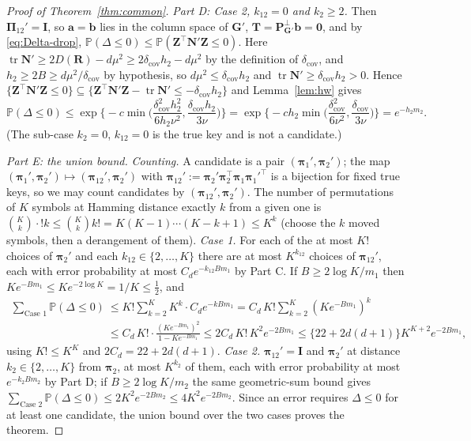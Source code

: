 \documentclass[11pt]{article}
\theoremstyle{definition}
\newcommand{\bT}{\mathbf{T}}
\newcommand{\bZ}{\mathbf{Z}}
\newcommand{\bI}{\mathbf{I}}
\newcommand{\bR}{\mathbf{R}}
\newcommand{\bN}{\mathbf{N}}
\newcommand{\bzero}{\mathbf{0}}
\newcommand{\bpi}{\boldsymbol{\pi}}
\newcommand{\bPi}{\boldsymbol{\Pi}}
\newcommand{\Prob}{\mathbb{P}}
\newcommand{\tr}{\operatorname{tr}}
\begin{document}
\begin{proof}[Proof of Theorem~\ref{thm:common}]
\emph{Part D: Case 2, $k_{12}=0$ and $k_2\ge2$.} Then $\bPi_{12}'=\bI$, so $\bm a=\bm b$ lies in the column space of $\mathbf G'$, $\bT=\mathbf P^\perp_{\mathbf G'}\bm b=\bzero$, and by \eqref{eq:Delta-drop}, $\Prob(\Delta\le0)\le\Prob(\bZ^\top\bN'\bZ\le0)$. Here $\tr\bN'\ge2D(\bR)-d\mu^2\ge2\delta_{\mathrm{cov}}h_2-d\mu^2$ by the definition of $\delta_{\mathrm{cov}}$, and $h_2\ge2B\ge d\mu^2/\delta_{\mathrm{cov}}$ by hypothesis, so $d\mu^2\le\delta_{\mathrm{cov}}h_2$ and $\tr\bN'\ge\delta_{\mathrm{cov}}h_2>0$. Hence $\{\bZ^\top\bN'\bZ\le0\}\subseteq\{\bZ^\top\bN'\bZ-\tr\bN'\le-\delta_{\mathrm{cov}}h_2\}$ and Lemma~\ref{lem:hw} gives
\[
\Prob(\Delta\le0)\le\exp\Big\{-c\min\Big(\frac{\delta_{\mathrm{cov}}^2h_2^2}{6h_2\nu^2},\frac{\delta_{\mathrm{cov}}h_2}{3\nu}\Big)\Big\}=\exp\Big\{-ch_2\min\Big(\frac{\delta_{\mathrm{cov}}^2}{6\nu^2},\frac{\delta_{\mathrm{cov}}}{3\nu}\Big)\Big\}=e^{-h_2m_2}.
\]
(The sub-case $k_2=0$, $k_{12}=0$ is the true key and is not a candidate.)

\emph{Part E: the union bound.} \emph{Counting.} A candidate is a pair $(\bpi_1',\bpi_2')$; the map $(\bpi_1',\bpi_2')\mapsto(\bpi_{12}',\bpi_2')$ with $\bpi_{12}':=\bpi_2'\bpi_2^\top\bpi_1\bpi_1'^\top$ is a bijection for fixed true keys, so we may count candidates by $(\bpi_{12}',\bpi_2')$. The number of permutations of $K$ symbols at Hamming distance exactly $k$ from a given one is $\binom Kk\cdot!k\le\binom Kkk!=K(K-1)\cdots(K-k+1)\le K^k$ (choose the $k$ moved symbols, then a derangement of them). \emph{Case 1.} For each of the at most $K!$ choices of $\bpi_2'$ and each $k_{12}\in\{2,\dots,K\}$ there are at most $K^{k_{12}}$ choices of $\bpi_{12}'$, each with error probability at most $C_de^{-k_{12}Bm_1}$ by Part C. If $B\ge2\log K/m_1$ then $Ke^{-Bm_1}\le Ke^{-2\log K}=1/K\le\tfrac12$, and
\begin{align*}
\sum_{\text{Case 1}}\Prob(\Delta\le0)&\le K!\sum_{k=2}^KK^k\cdot C_de^{-kBm_1}=C_d\,K!\sum_{k=2}^K(Ke^{-Bm_1})^k\\
&\le C_d\,K!\cdot\frac{(Ke^{-Bm_1})^2}{1-Ke^{-Bm_1}}\le2C_d\,K!\,K^2e^{-2Bm_1}\le\{22+2d(d+1)\}K^{K+2}e^{-2Bm_1},
\end{align*}
using $K!\le K^K$ and $2C_d=22+2d(d+1)$. \emph{Case 2.} $\bpi_{12}'=\bI$ and $\bpi_2'$ at distance $k_2\in\{2,\dots,K\}$ from $\bpi_2$, at most $K^{k_2}$ of them, each with error probability at most $e^{-k_2Bm_2}$ by Part D; if $B\ge2\log K/m_2$ the same geometric-sum bound gives $\sum_{\text{Case 2}}\Prob(\Delta\le0)\le2K^2e^{-2Bm_2}\le4K^2e^{-2Bm_2}$. Since an error requires $\Delta\le0$ for at least one candidate, the union bound over the two cases proves the theorem.


\end{proof}
\end{document}
